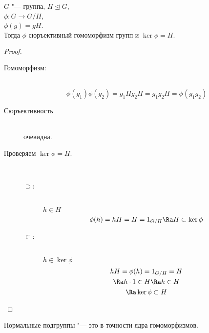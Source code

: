 \begin{theorem}
	$G$ "--- группа, $H \unlhd G$,\\
	$\phi \colon G \to G / H$, \\
	$\phi(g) = gH$.\\
	Тогда $\phi$ сюръективный гомоморфизм групп и $\ker \phi = H$.
\end{theorem}
\begin{proof}
        \begin{description}
        \item [Гомоморфизм:] \hfill \\
	\[ \phi(g_1)\phi(g_2) = g_1Hg_2H = g_1g_2H = \phi(g_1g_2) \]
	\item [Сюръективность] \hfill \\
	 очевидна. 

	\item [Проверяем $\ker \phi = H$.] \hfill \\
	\begin{description}
	\item[$\supset$:] \hfill \\
		$h \in H$
		\[ \phi(h) = hH =  H = 1_{G/H} \Ra H \subset \ker \phi \]

	\item[$\subset$:] \hfill \\
		$h \in \ker \phi$
		\begin{gather*}
			hH = \phi(h) = 1_{G/H} = H \\
			\Ra h\cdot1 \in H \Ra h \in H \\
			\Ra \ker \phi \subset H
		\end{gather*}
	\end{description}
	\end{description}
\end{proof}

\begin{conseq}
	Нормальные подгруппы "--- это в точности ядра гомоморфизмов.
\end{conseq}
